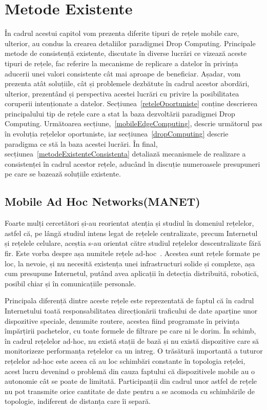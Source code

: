 \documentclass[12pt,a4paper]{report}
\begin{document}
\chapter{Metode Existente} \label{metodeExistente}
În cadrul acestui capitol vom prezenta diferite tipuri de rețele mobile care, ulterior, au condus la crearea detaliilor paradigmei Drop Computing. Principale metode de consistență existente, discutate în diverse lucrări ce vizează aceste tipuri de rețele, fac referire la mecanisme de replicare a datelor în privința aducerii unei valori consistente cât mai aproape de beneficiar. Așadar, vom prezenta atât soluțiile, cât și problemele dezbătute în cadrul acestor abordări, ulterior, prezentând și perspectiva acestei lucrări cu privire la posibilitatea coruperii intenționate a datelor.
Secțiunea~\ref{reteleOportuniste} conține descrierea principalului tip de rețele care a stat la baza dezvoltării paradigmei Drop Computing. Următoarea secțiune,~\ref{mobileEdgeComputing}, descrie următorul pas în evoluția rețelelor oportuniste, iar secțiunea~\ref{dropComputing} descrie paradigma ce stă la baza acestei lucrări. În final, secțiunea~\ref{metodeExistenteConsistenta} detaliază mecanismele de realizare a consistenței în cadrul acestor rețele, aducând în discuție numeroasele presupuneri pe care se bazează soluțiile existente.  
 
\iffalse 
\section{Mobile Ad Hoc Networks(MANET)}
Foarte mulți cercetători și-au reorientat atenția și studiul în domeniul rețelelor, astfel că, pe lângă studiul intens legat de rețelele centralizate, precum Internetul și rețelele celulare, aceștia s-au orientat către studiul rețelelor descentralizate fără fir. Este vorba despre așa numitele rețele ad-hoc~\cite{MITArticle}. Acestea sunt rețele formate pe loc, la nevoie, și nu necesită existența unei infrastructuri solide și complexe, așa cum presupune Internetul, putând avea aplicații în detecția distribuită, robotică, posibil chiar și în comunicațiile personale.

Principala diferență dintre aceste rețele este reprezentată de faptul că în cadrul Internetului toată responsabilitatea direcționării traficului de date aparține unor dispozitive speciale, denumite routere, acestea fiind programate în privința împărțirii pachetelor, cu toate formele de filtrare pe care ni le dorim. În schimb, în cadrul rețelelor ad-hoc, nu există stații de bază și nu există dispozitive care să monitorizeze performanța rețelelor ca un intreg. O trăsătură importantă a tuturor rețelelor ad-hoc este aceea că au loc schimbări constante în topologia rețelei, acest lucru devenind o problemă din cauza faptului că dispozitivele mobile au o autonomie cât se poate de limitată. Participanții din cadrul unor astfel de rețele nu pot transmite orice cantitate de date pentru a se acomoda cu schimbările de topologie, indiferent de distanța care îi separă.
\end{document}
